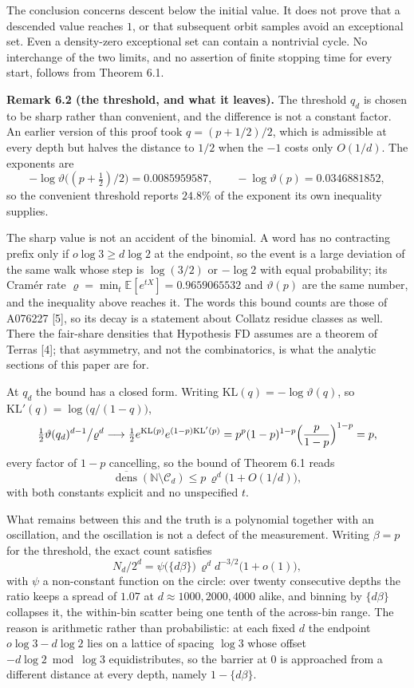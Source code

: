 \documentclass[11pt,a4paper]{article}
\begin{document}
The conclusion concerns descent below the initial value. It does not
prove that a descended value reaches \(1\), or that subsequent orbit
samples avoid an exceptional set. Even a density-zero exceptional set
can contain a nontrivial cycle. No interchange of the two limits, and no
assertion of finite stopping time for every start, follows from Theorem
6.1.

\textbf{Remark 6.2 (the threshold, and what it leaves).} The threshold
\(q_d\) is chosen to be sharp rather than convenient, and the difference
is not a constant factor. An earlier version of this proof took
\(q=(p+1/2)/2\), which is admissible at every depth but halves the
distance to \(1/2\) when the \(-1\) costs only \(O(1/d)\). The exponents
are \[
-\log\vartheta\bigl((p+\tfrac12)/2\bigr)=0.0085959587,\qquad
-\log\vartheta(p)=0.0346881852,
\] so the convenient threshold reports \(24.8\%\) of the exponent its
own inequality supplies.

The sharp value is not an accident of the binomial. A word has no
contracting prefix only if \(o\log3\ge d\log2\) at the endpoint, so the
event is a large deviation of the same walk whose step is \(\log(3/2)\)
or \(-\log2\) with equal probability; its Cram\'{e}r rate
\(\varrho=\min_t\mathbb E[e^{tX}]=0.9659065532\) and \(\vartheta(p)\)
are the same number, and the inequality above reaches it. The words this
bound counts are those of A076227 {[}5{]}, so its decay is a statement
about Collatz residue classes as well. There the fair-share densities
that Hypothesis \(\mathrm{FD}\) assumes are a theorem of Terras {[}4{]};
that asymmetry, and not the combinatorics, is what the analytic sections
of this paper are for.

At \(q_d\) the bound has a closed form. Writing
\(\mathrm{KL}(q)=-\log\vartheta(q)\), so
\(\mathrm{KL}'(q)=\log\bigl(q/(1-q)\bigr)\), \[
\tfrac12\vartheta(q_d)^{d-1}\big/\varrho^{d}
\longrightarrow\tfrac12e^{\mathrm{KL}(p)}e^{(1-p)\mathrm{KL}'(p)}
=p^{p}(1-p)^{1-p}\Bigl(\frac{p}{1-p}\Bigr)^{1-p}=p,
\] every factor of \(1-p\) cancelling, so the bound of Theorem 6.1 reads
\[
\overline{\operatorname{dens}}(\mathbb N\setminus\mathcal C_d)
\le p\,\varrho^{d}\bigl(1+O(1/d)\bigr),
\] with both constants explicit and no unspecified \(t\).

What remains between this and the truth is a polynomial together with an
oscillation, and the oscillation is not a defect of the measurement.
Writing \(\beta=p\) for the threshold, the exact count satisfies \[
N_d/2^d=\psi\bigl(\{d\beta\}\bigr)\,\varrho^{d}d^{-3/2}\bigl(1+o(1)\bigr),
\] with \(\psi\) a non-constant function on the circle: over twenty
consecutive depths the ratio keeps a spread of \(1.07\) at
\(d\approx1000,2000,4000\) alike, and binning by \(\{d\beta\}\)
collapses it, the within-bin scatter being one tenth of the across-bin
range. The reason is arithmetic rather than probabilistic: at each fixed
\(d\) the endpoint \(o\log3-d\log2\) lies on a lattice of spacing
\(\log3\) whose offset \(-d\log2\bmod\log3\) equidistributes, so the
barrier at \(0\) is approached from a different distance at every depth,
namely \(1-\{d\beta\}\).
\end{document}
